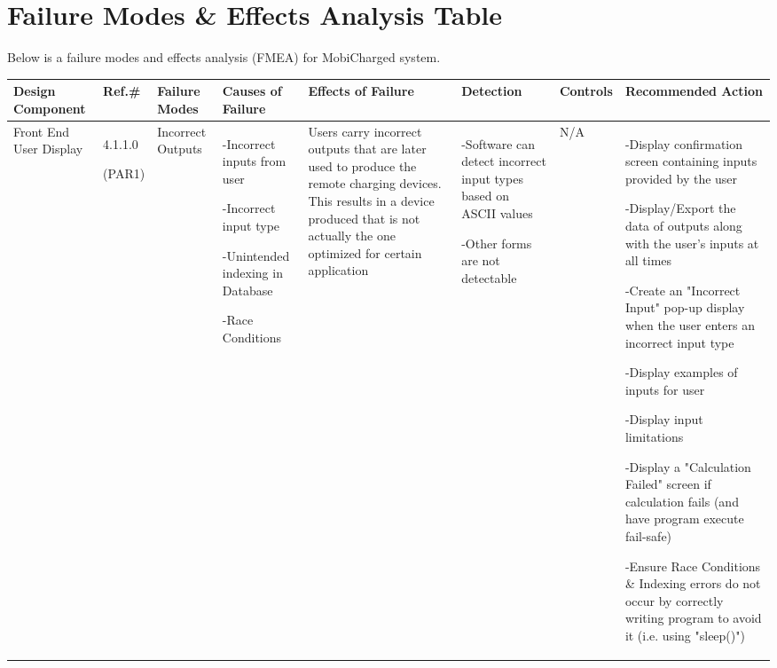 \documentclass[12pt, titlepage]{article}
\begin{document}
\section{Failure Modes & Effects Analysis Table}
Below is a failure modes and effects analysis (FMEA) for MobiCharged system.
\newpage
\fancyhf{}
\fancyhead[C]{\thepage}
\renewcommand{\headrulewidth}{0pt}
\pagestyle{fancy}
\begin{center}
\begin{adjustwidth}{-3.5cm}{}
\begin{tabular}{|p{1.5cm}|p{1.4cm}|p{1.5cm}|p{2cm}|p{3.5cm}|p{2cm}|p{1.4cm}|p{4.3cm}|}
\hline
Design Component & Ref.\# & Failure Modes & Causes of Failure & Effects of Failure & Detection & Controls & Recommended Action\\
\hline
Front End User Display & 4.1.1.0 \par(PAR1) & Incorrect Outputs & -Incorrect inputs from user \par -Incorrect input type \par -Unintended indexing in Database \par -Race Conditions & Users carry incorrect outputs that are later used to produce the remote charging devices. This results in a device produced that is not actually the one optimized for certain application & -Software can detect incorrect input types based on ASCII values \par -Other forms are not detectable & N/A & -Display confirmation screen containing inputs provided by the user \par -Display/Export the data of outputs along with the user's inputs at all times \par -Create an "Incorrect Input" pop-up display when the user enters an incorrect input type \par -Display examples of inputs for user \par -Display input limitations \par -Display a "Calculation Failed" screen if calculation fails (and have program execute fail-safe) \par -Ensure Race Conditions \& Indexing errors do not occur by correctly writing program to avoid it (i.e. using "sleep()") \par\\


\end{tabular}
\end{adjustwidth}
\end{center}
\end{document}
